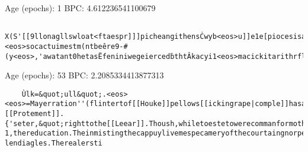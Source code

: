 

Age (epochs): 1
BPC: 4.612236541100679
\begin{verbatim}
	X(S'[[9llonagllswloat<ftaespr]]]picheangithensĊwyb<eos>u]]e1e[piocesisagasy.tantherytolasæoefthectpṡshoypung[lels"ploialelaotitheeeslfranotst43th]eapyenss<eos>ḟ[heenyasallr'asaA|a]htlonteapror=a0en[tvalarglamthRulNirosndisarssAichereischy<eos>lAare/iorenyceerurywdrogdp'.alaWeCbwoutinorea]<eos>socactuimestm(ntbeêre9-#(y<eos>,'awatant0hetasËfeniniwegeiercedḃthtÂkacyi1<eos>macickitarithrflimsengctrmpredåu,r'f&litbaltouolodalolsingongRNd'oléieheribue<eos>AnhCathocicis\thasg=gisiotyersldathtgo|-
\end{verbatim}

Age (epochs): 53
BPC: 2.2085334413877313
\begin{verbatim}
	Ùlk=&quot;ull&quot;.<eos><eos>=Mayerration''(flintertof[[Houke]]pellows[[ickingrape|comple]]hasandwith19heredisatirefromhutorthe[[Onpultact]][[Protement]].{'seter,&quot;righttothe[[Leear]].Thoush,whiletoestetowerecommanformotheconcethesefhershatpreservenoclassicaticnitedfreek'AynCanber1,Unitedtopudate.Inthisparication.ThisisneviewvintofpertoleknowbeddirAryformumeballsysuduetheristodiviawisesofadran-1,thereducation.Theinmistingthecappuylivemespecameryofthecourtaingnorper,o-lendiagles.Therealersti
\end{verbatim}